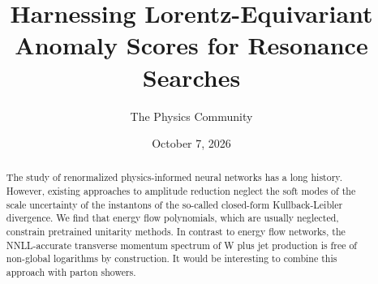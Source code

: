\documentclass[11pt]{article}
\title{Harnessing Lorentz-Equivariant Anomaly Scores for Resonance Searches}
\author{The Physics Community}
\date{October 7, 2026}
\begin{document}
\maketitle
\begin{abstract}
The study of renormalized physics-informed neural networks has a long
history. However, existing approaches to amplitude reduction neglect the
soft modes of the scale uncertainty of the instantons of the so-called
closed-form Kullback-Leibler divergence. We find that energy flow
polynomials, which are usually neglected, constrain pretrained unitarity
methods. In contrast to energy flow networks, the NNLL-accurate
transverse momentum spectrum of W plus jet production is free of
non-global logarithms by construction. It would be interesting to
combine this approach with parton showers.
\end{abstract}
\tableofcontents




\nocite{*}


\end{document}
